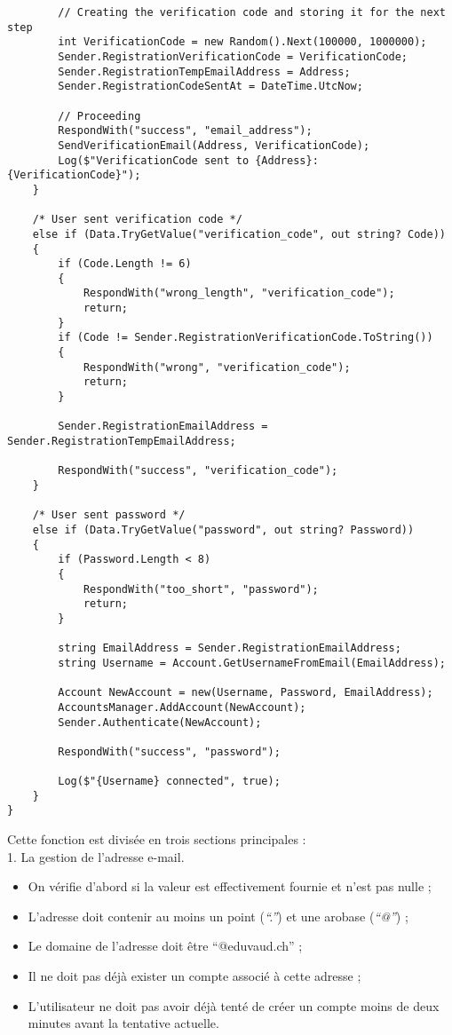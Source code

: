 \documentclass{article}
\begin{document}
\begin{verbatim}
        // Creating the verification code and storing it for the next step
        int VerificationCode = new Random().Next(100000, 1000000);
        Sender.RegistrationVerificationCode = VerificationCode;
        Sender.RegistrationTempEmailAddress = Address;
        Sender.RegistrationCodeSentAt = DateTime.UtcNow;

        // Proceeding
        RespondWith("success", "email_address");
        SendVerificationEmail(Address, VerificationCode);
        Log($"VerificationCode sent to {Address}: {VerificationCode}");
    }

    /* User sent verification code */
    else if (Data.TryGetValue("verification_code", out string? Code))
    {
        if (Code.Length != 6)
        {
            RespondWith("wrong_length", "verification_code");
            return;
        }
        if (Code != Sender.RegistrationVerificationCode.ToString())
        {
            RespondWith("wrong", "verification_code");
            return;
        }

        Sender.RegistrationEmailAddress = Sender.RegistrationTempEmailAddress;

        RespondWith("success", "verification_code");
    }

    /* User sent password */
    else if (Data.TryGetValue("password", out string? Password))
    {
        if (Password.Length < 8)
        {
            RespondWith("too_short", "password");
            return;
        }

        string EmailAddress = Sender.RegistrationEmailAddress;
        string Username = Account.GetUsernameFromEmail(EmailAddress);

        Account NewAccount = new(Username, Password, EmailAddress);
        AccountsManager.AddAccount(NewAccount);
        Sender.Authenticate(NewAccount);

        RespondWith("success", "password");

        Log($"{Username} connected", true);
    }
}
\end{verbatim}

Cette fonction est divisée en trois sections principales :
\\

1. La gestion de l’adresse e-mail.

\begin{itemize}
    \item On vérifie d'abord si la valeur est effectivement fournie et n'est pas nulle ;
    \item L’adresse doit contenir au moins un point (\textit{“.”}) et une arobase (\textit{“@”}) ;
    \item Le domaine de l’adresse doit être “@eduvaud.ch” ;
    \item Il ne doit pas déjà exister un compte associé à cette adresse ;
    \item L’utilisateur ne doit pas avoir déjà tenté de créer un compte moins de deux minutes avant la tentative actuelle.
\end{itemize}
\end{document}
